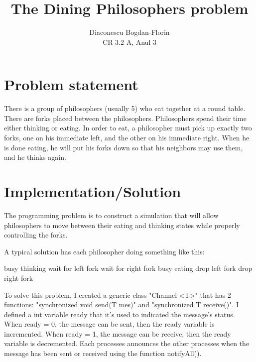 \documentclass{article}
\title{The Dining Philosophers problem}
\author{Diaconescu Bogdan-Florin\\ CR 3.2 A, Anul 3}
\begin{document}
\maketitle
\newpage
\section{Problem statement}
\hspace{0.5 cm}
There is a group of philosophers (usually 5) who eat together at a round table. There are forks placed between the philosophers. Philosophers spend their time either thinking or eating. In order to eat, a philosopher must pick up exactly two forks, one on his immediate left, and the other on his immediate right. When he is done eating, he will put his forks down so that his neighbors may use them, and he thinks again.

\section{Implementation/Solution}
\hspace{0.5 cm}
The programming problem is to construct a simulation that will allow philosophers to move between their eating and thinking states while properly controlling the forks. 

 \hspace{0.5 cm}
 A typical solution has each philosopher doing something like this:
 
\begin{algorithm} 
\caption{}
\begin{algorithmic}[1]

\STATE busy thinking
\STATE wait for left fork
\STATE wait for right fork
\STATE busy eating
\STATE drop left fork
\STATE drop right fork
\ENDWHILE

\end{algorithmic}
\end{algorithm}
 
\hspace{0.5 cm}
To solve this problem, I created a generic class "Channel <T>" that has 2 functions: "synchronized void send(T mes)" and "synchronized T receive()". I defined a int variable ready that it's used to indicated the message's status. When ready = 0, the message can be sent, then the ready variable is incremented. When ready = 1, the message can be receive, then the ready variable is decremented. Each processes announces the other processes when the message has been sent or received using the function notifyAll(). 
\end{document}
